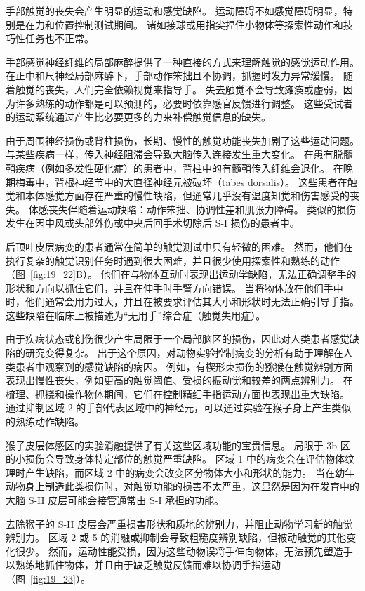 手部触觉的丧失会产生明显的运动和感觉缺陷。
运动障碍不如感觉障碍明显，特别是在力和位置控制测试期间。
诸如接球或用指尖捏住小物体等探索性动作和技巧性任务也不正常。


手部感觉神经纤维的局部麻醉提供了一种直接的方式来理解触觉的感觉运动作用。
在正中和尺神经局部麻醉下，手部动作笨拙且不协调，抓握时发力异常缓慢。
随着触觉的丧失，人们完全依赖视觉来指导手。
失去触觉不会导致瘫痪或虚弱，因为许多熟练的动作都是可以预测的，必要时依靠感官反馈进行调整。
这些受试者的运动系统通过产生比必要更多的力来补偿触觉信息的缺失。


由于周围神经损伤或背柱损伤，长期、慢性的触觉功能丧失加剧了这些运动问题。
与某些疾病一样，传入神经阻滞会导致大脑传入连接发生重大变化。
在患有脱髓鞘疾病（例如多发性硬化症）的患者中，背柱中的有髓鞘传入纤维会退化。
在晚期梅毒中，背根神经节中的大直径神经元被破坏（tabes dorsalis）。
这些患者在触觉和本体感觉方面存在严重的慢性缺陷，但通常几乎没有温度知觉和伤害感受的丧失。
体感丧失伴随着运动缺陷：动作笨拙、协调性差和肌张力障碍。
类似的损伤发生在因中风或头部外伤或中央后回手术切除后 S-I 损伤的患者中。


后顶叶皮层病变的患者通常在简单的触觉测试中只有轻微的困难。
然而，他们在执行复杂的触觉识别任务时遇到很大困难，并且很少使用探索性和熟练的动作（图~\ref{fig:19_22}B）。
他们在与物体互动时表现出运动学缺陷，无法正确调整手的形状和方向以抓住它们，并且在伸手时手臂方向错误。 
当将物体放在他们手中时，他们通常会用力过大，并且在被要求评估其大小和形状时无法正确引导手指。
这些缺陷在临床上被描述为“无用手”综合症（触觉失用症）。


由于疾病状态或创伤很少产生局限于一个局部脑区的损伤，因此对人类患者感觉缺陷的研究变得复杂。
出于这个原因，对动物实验控制病变的分析有助于理解在人类患者中观察到的感觉缺陷的病因。
例如，有楔形束损伤的猕猴在触觉辨别方面表现出慢性丧失，例如更高的触觉阈值、受损的振动觉和较差的两点辨别力。
在梳理、抓挠和操作物体期间，它们在控制精细手指运动方面也表现出重大缺陷。
通过抑制区域 2 的手部代表区域中的神经元，可以通过实验在猴子身上产生类似的熟练动作缺陷。


猴子皮层体感区的实验消融提供了有关这些区域功能的宝贵信息。
局限于 3b 区的小损伤会导致身体特定部位的触觉严重缺陷。
区域 1 中的病变会在评估物体纹理时产生缺陷，而区域 2 中的病变会改变区分物体大小和形状的能力。
当在幼年动物身上制造此类损伤时，对触觉功能的损害不太严重，这显然是因为在发育中的大脑 S-II 皮层可能会接管通常由 S-I 承担的功能。


去除猴子的 S-II 皮层会严重损害形状和质地的辨别力，并阻止动物学习新的触觉辨别力。
区域 2 或 5 的消融或抑制会导致粗糙度辨别缺陷，但被动触觉的其他变化很少。
然而，运动性能受损，因为这些动物误将手伸向物体，无法预先塑造手以熟练地抓住物体，并且由于缺乏触觉反馈而难以协调手指运动（图~\ref{fig:19_23}）。


